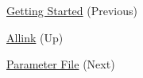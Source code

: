
\begin{DoxyItemize}
\item \hyperlink{usage_page}{Getting Started} (Previous)  
\item \hyperlink{index}{Allink} (Up)  
\item \hyperlink{param_page}{Parameter File} (Next)  
\end{DoxyItemize}